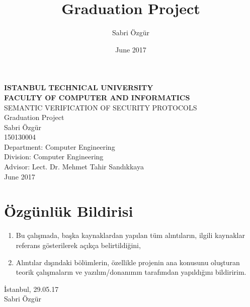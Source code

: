 \documentclass[a4paper, 12pt, titlepage]{article}
\title{Graduation Project}
\author{Sabri Özgür}
\date{June 2017}
\begin{document}

\begin{titlepage}
    \bfseries %
    \sffamily %
	\begin{center}
		\LARGE{\textbf{ISTANBUL TECHNICAL UNIVERSITY \\ 
               FACULTY OF COMPUTER AND INFORMATICS} } \\
		\vspace{5cm}
		\LARGE{SEMANTIC VERIFICATION OF SECURITY PROTOCOLS}  \\
		\vspace{4cm}
		\Large{Graduation Project} \\
        \vspace{0.5cm}
		\Large{Sabri Özgür} \\
     	\Large{150130004} \\
        \vspace{4cm}
        \large{Department: Computer Engineering} \\
        \large{Division: Computer Engineering} \\
        \vspace{1.5cm}
        \large{Advisor: Lect. Dr. Mehmet Tahir Sandıkkaya} \\
		\vspace{\fill} %
		\large{\normalfont \sffamily June 2017}
	\end{center}
\end{titlepage}

\newpage
\section*{Özgünlük Bildirisi}
\begin{enumerate}
    \item Bu çalışmada, başka kaynaklardan yapılan tüm alıntıların, ilgili kaynaklar \\ referans gösterilerek açıkça belirtildiğini,
    \item Alıntılar dışındaki bölümlerin, özellikle projenin ana konusunu oluşturan teorik çalışmaların ve yazılım/donanımın tarafımdan yapıldığını
    bildiririm.
\end{enumerate}
\vspace{1em}
İstanbul, 29.05.17
\vspace{3em}\\Sabri Özgür
\end{document}
